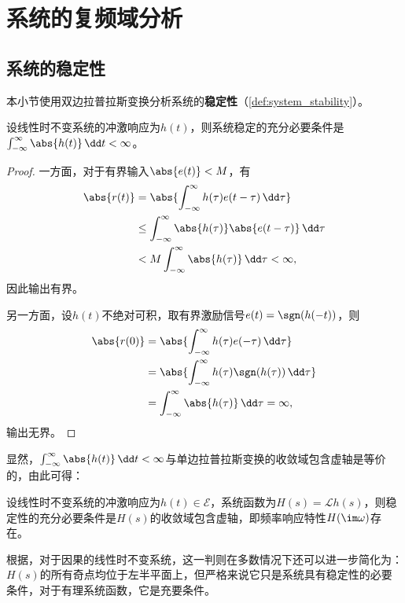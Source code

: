\section{系统的复频域分析}\label{sec:Complex_Freq_Analysis}

\subsection{系统的稳定性}\label{sub:stability_of_system}
本小节使用双边拉普拉斯变换分析系统的\textbf{稳定性}（\cref{def:system_stability}）。
\begin{proposition}[稳定性的时域判则]
    设线性时不变系统的冲激响应为$h(t)$，则系统稳定的充分必要条件是$\int_{-\infty}^{\infty}\abs{h(t)}\,\dd t<\infty$。
\end{proposition}
\begin{proof}
    一方面，对于有界输入$\abs{e(t)}<M$，有
    \begin{align}
        \abs{r(t)}&=\abs{\int_{-\infty}^{\infty}h(\tau)e(t-\tau)\,\dd\tau}\nonumber\\
        &\leq \int_{-\infty}^{\infty}\abs{h(\tau)}\abs{e(t-\tau)}\,\dd\tau\nonumber\\
        &<M\int_{-\infty}^{\infty}\abs{h(\tau)}\,\dd\tau<\infty,
    \end{align}
    因此输出有界。

    另一方面，设$h(t)$不绝对可积，取有界激励信号$e(t)=\sgn(h(-t))$，则
    \begin{align}
        \abs{r(0)}&=\abs{\int_{-\infty}^{\infty}h(\tau)e(-\tau)\,\dd\tau}\nonumber\\
        &=\abs{\int_{-\infty}^{\infty}h(\tau)\sgn(h(\tau))\,\dd\tau}\nonumber\\
        &=\int_{-\infty}^{\infty}\abs{h(\tau)}\,\dd\tau=\infty,
    \end{align}
    输出无界。
\end{proof}

显然，$\int_{-\infty}^{\infty}\abs{h(t)}\,\dd t<\infty$与单边拉普拉斯变换的收敛域包含虚轴是等价的，由此可得：

\begin{proposition}[稳定性的复频域判则]\label{prop:statibility_s}
    设线性时不变系统的冲激响应为$h(t)\in\mathcal{E}$，系统函数为$H(s)=\mathcal{L}h(s)$，则稳定性的充分必要条件是$H(s)$的收敛域包含虚轴，即频率响应特性$H(\im\omega)$存在。
\end{proposition}

根据，对于因果的线性时不变系统，这一判则在多数情况下还可以进一步简化为：$H(s)$的所有奇点均位于左半平面上，但严格来说它只是系统具有稳定性的必要条件，对于有理系统函数，它是充要条件。

